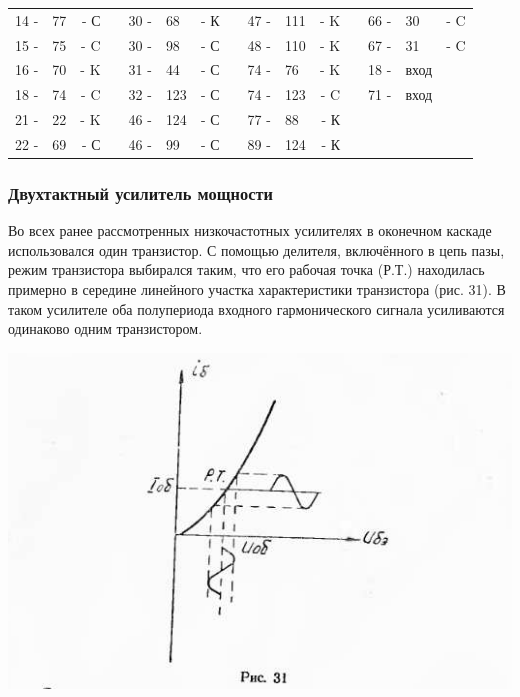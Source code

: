 \documentclass[12pt]{article}
\begin{document}
\begin{tabular}{r l r p{0.5cm} r l r p{0.5cm} r l r p{0.5cm} r l r}
14 - & 77  & - С &   & 30 - & 68  & - К &    &  47 - & 111 & - K &   &  66 - & 30 & - C \\
15 - & 75  & - C &   & 30 - & 98  & - С &    &  48 - & 110 & - K &   &  67 - & 31 & - C\\
16 - & 70  & - K &   & 31 - & 44  & - С &    &  74 - & 76  & - K &   &  18 - & вход & \\
18 - & 74  & - C &   & 32 - & 123 & - С &    &  74 - & 123 & - C &   &  71 - & вход & \\
21 - & 22  & - K &   & 46 - & 124 & - С &    &  77 - & 88  & - К &   &       &      & \\
22 - & 69  & - С &   & 46 - & 99  & - С &    &  89 - & 124 & - К &   &       &      & \\
\end{tabular}

\hrulefill

\subsubsection{Двухтактный усилитель мощности}

Во всех ранее рассмотренных низкочастотных усилителях в оконечном каскаде использовался один транзистор. С помощью делителя, включённого в цепь пазы, режим транзистора выбирался таким, что его рабочая точка (Р.Т.) находилась примерно в середине линейного участка характеристики транзистора (рис. 31). В таком усилителе оба полупериода входного гармонического сигнала усиливаются одинаково одним транзистором.

\includegraphics[scale=0.83, angle=2]{ekon3_028_1}
\end{document}
